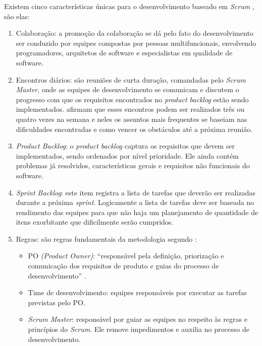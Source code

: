 Existem cinco características únicas para o desenvolvimento baseado em \textit{Scrum} \cite{matharu2015empirical}, são elas:

\begin{enumerate}
 \item Colaboração: a promoção da colaboração se dá pelo fato do desenvolvimento ser conduzido por equipes compostas por pessoas multifuncionais, envolvendo programadores, arquitetos de software e especialistas em qualidade de software.
 
 \item Encontros diários: são reuniões de curta duração, comandadas pelo \textit{Scrum Master}, onde as equipes de desenvolvimento se comunicam e discutem o progresso com que os requisitos encontrados no \textit{product backlog} estão sendo implementados.  afirmam que esses encontros podem ser realizados três ou quatro vezes na semana e neles os assuntos mais frequentes se baseiam nas dificuldades encontradas e como vencer os obstáculos até a próxima reunião.
 
 \item \textit{Product Backlog}: o \textit{product backlog} captura os requisitos que devem ser implementados, sendo ordenados por nível prioridade. Ele ainda contém problemas já resolvidos, características gerais e requisitos não funcionais do software.
 
 \item \textit{Sprint Backlog}: este item registra a lista de tarefas que deverão ser realizadas durante a próxima \textit{sprint}. Logicamente a lista de tarefas deve ser baseada no rendimento das equipes para que não haja um planejamento de quantidade de itens exorbitante que dificilmente serão cumpridos. 
 
 \item Regras: são regras fundamentais da metodologia segundo :
 \begin{itemize}
  \item PO \textit{(Product Owner)}: ``responsável pela definição, priorização e comunicação dos requisitos de produto e guias do processo de desenvolvimento'' \cite[~p. 3, tradução nossa]{matharu2015empirical}.
  
  \item Time de desenvolvimento: equipes responsáveis por executar as tarefas previstas pelo PO.
 
  \item \textit{Scrum Master}: responsável por guiar as equipes no respeito às regras e princípios do \textit{Scrum}. Ele remove impedimentos e auxilia no processo de desenvolvimento.
  
 \end{itemize}
 
\end{enumerate}


